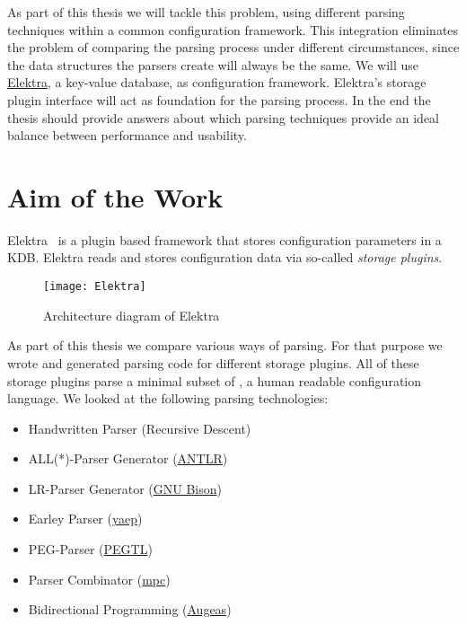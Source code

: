 As part of this thesis we will tackle this problem, using different parsing techniques within a common configuration framework. This integration eliminates the problem of comparing the parsing process under different circumstances, since the data structures the parsers create will always be the same. We will use \href{http://web.libelektra.org}{Elektra}, a key-value database, as configuration framework. Elektra’s storage plugin interface will act as foundation for the parsing process. In the end the thesis should provide answers about which parsing techniques provide an ideal balance between performance and usability.

\section{Aim of the Work}
\label{sec:aim_of_the_work}

Elektra~\cite{raab2010modular, raab2017context} is a plugin based framework that stores configuration parameters in a \glsdesc{KDB}. Elektra reads and stores configuration data via so-called \emph{storage plugins}.

\begin{figure}[H]
  \centering
    \texttt{[image: Elektra]}
  \caption{Architecture diagram of Elektra}
\end{figure}

As part of this thesis we compare various ways of parsing. For that purpose we wrote and generated parsing code for different storage plugins. All of these storage plugins parse a minimal subset of , a human readable configuration language. We looked at the following parsing technologies:

\begin{itemize}
  \item Handwritten Parser (Recursive Descent)
  \item ALL(*)-Parser Generator (\href{http://www.antlr.org}{ANTLR})
  \item LR-Parser Generator (\href{https://www.gnu.org/software/bison}{GNU Bison})
  \item Earley Parser (\href{https://github.com/vnmakarov/yaep}{yaep})
  \item PEG-Parser (\href{https://github.com/ColinH/PEGTL}{PEGTL})
  \item Parser Combinator (\href{https://github.com/orangeduck/mpc}{mpc})
  \item Bidirectional Programming (\href{http://augeas.net}{Augeas})
\end{itemize}

